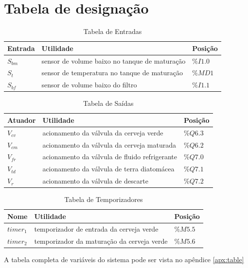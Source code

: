\documentclass[12pt]{article}
\begin{document}
\section {Tabela de designação}
\begin{table}[H]
	\caption{Tabela de Entradas}
	\centering
	\begin{tabular}{|  p{2cm} | p{10cm} | p{2cm} | }
		\hline
		Entrada & Utilidade & Posição\\
		\hline
		$S_{bm}$ & sensor de volume baixo no tanque de maturação & $\%I1.0$ \\
		$S_t$ & sensor de temperatura no tanque de maturação & $\%MD1$ \\
		$S_{bf}$ & sensor de volume baixo do filtro & $\%I1.1$ \\
		\hline
	\end{tabular}
\end{table}


\begin{table}[H]
	\caption{Tabela de Saídas}
	\centering
	\begin{tabular}{|  p{2cm} | p{10cm} | p{2cm} | }
		\hline
		Atuador & Utilidade & Posição\\
		\hline
  		$V_{cv}$ & acionamento da válvula da cerveja verde & $\%Q6.3$ \\
  		$V_{cm}$ & acionamento da válvula da cerveja maturada & $\%Q6.2$ \\
 		$V_{fr}$ & acionamento da válvula de fluido refrigerante & $\%Q7.0$ \\
		$V_{td}$ & acionamento da válvula de terra diatomácea & $\%Q7.1$ \\
		$V_r$ & acionamento da válvula de descarte & $\%Q7.2$ \\
 		\hline
	\end{tabular}
\end{table}


\begin{table}[H]
	\caption{Tabela de Temporizadores}
	\centering
	\begin{tabular}{|  p{2cm} | p{10cm} | p{2cm} | }
		\hline
		Nome & Utilidade & Posição\\
		\hline
		$timer_1$ &  temporizador de entrada da cerveja verde & $\%M5.5$ \\
		$timer_2$ & temporizador da maturação da cerveja verde & $\%M5.6$ \\
		 \hline
	\end{tabular}
\end{table}

A tabela completa de variáveis do sistema pode ser vista no apêndice \ref{apx:table}
\end{document}
